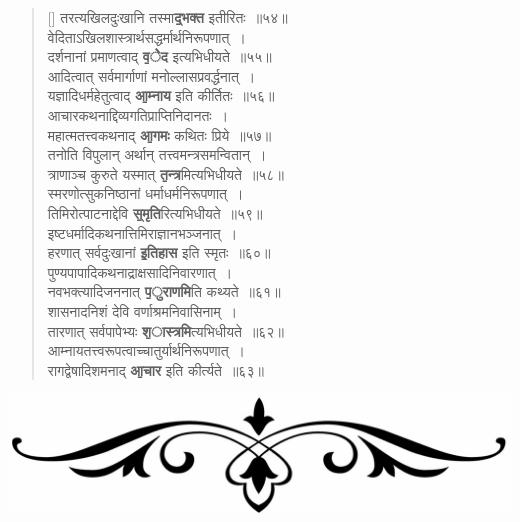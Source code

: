 \documentclass[twoside,12pt,notitlepage]{book}
\begin{document}
\begin{verse}[\versewidth]
तरत्यखिलदुःखानि तस्मा\textbf{\b द्भक्त} इतीरितः~॥५४॥\\
वेदिताऽखिलशास्त्रार्थसद्धर्मार्थनिरूपणात्~।\\[-6pt]
दर्शनानां प्रमाणत्वाद् \textbf{\b वेेद} इत्यभिधीयते~॥५५॥\\
आदित्वात् सर्वमार्गाणां मनोल्लासप्रवर्द्धनात्~।\\[-6pt]
यज्ञादिधर्महेतुत्वाद् \textbf{\b आम्नाय} इति कीर्तितः~॥५६॥\\
आचारकथनाद्दिव्यगतिप्राप्तिनिदानतः~।\\[-6pt]
महात्मतत्त्वकथनाद् \textbf{\b आगमः} कथितः प्रिये~॥५७॥\\
तनोति विपुलान् अर्थान् तत्त्वमन्त्रसमन्वितान्~।\\[-6pt]
त्राणाञ्च कुरुते यस्मात् \textbf{\b तन्त्र}मित्यभिधीयते~॥५८॥\\
स्मरणोत्सुकनिष्ठानां धर्माधर्मनिरूपणात्~।\\[-6pt]
तिमिरोत्पाटनाद्देवि  \textbf{\b स्मृति}रित्यभिधीयते~॥५९॥\\
इष्टधर्मादिकथनात्तिमिराज्ञानभञ्जनात्~।\\[-6pt]
हरणात् सर्वदुःखानां \textbf{\b इतिहास} इति स्मृतः~॥६०॥\\
पुण्यपापादिकथनाद्राक्षसादिनिवारणात्~।\\[-6pt]
नवभक्त्यादिजननात् \textbf{\b पुराणमि}ति कथ्यते~॥६१॥\\
शासनादनिशं देवि वर्णाश्रमनिवासिनाम्~।\\[-6pt]
तारणात् सर्वपापेभ्यः \textbf{\b शास्त्रमि}त्यभिधीयते~॥६२॥\\
आम्नायतत्त्वरूपत्वाच्चातुर्यार्थनिरूपणात्~।\\[-6pt]
रागद्वेषादिशमनाद् \textbf{\b आचार} इति कीर्त्यते~॥६३॥\footA
\end{verse}
\begin{center}\includegraphics[scale=0.08]{end}\end{center}

\clearpage
\end{document}
